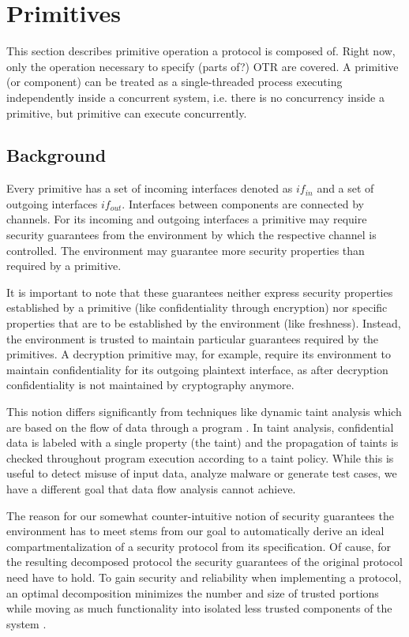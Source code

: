 \documentclass[a4paper,twocolumn]{article}
\begin{document}
\section{Primitives}

This section describes primitive operation a protocol is composed of. Right
now, only the operation necessary to specify (parts of?) OTR are covered. A
primitive (or component) can be treated as a single-threaded process executing
independently inside a concurrent system, i.e. there is no concurrency inside a
primitive, but primitive can execute concurrently.

\subsection{Background}

Every primitive has a set of incoming interfaces denoted as $if_{in}$ and a
set of outgoing interfaces $if_{out}$. Interfaces between components are
connected by channels. For its incoming and outgoing interfaces a primitive may
require security guarantees from the environment by which the respective
channel is controlled. The environment may guarantee more security properties
than required by a primitive.

It is important to note that these guarantees neither express security
properties established by a primitive (like confidentiality through encryption)
nor specific properties that are to be established by the environment (like
freshness). Instead, the environment is trusted to maintain particular
guarantees required by the primitives. A decryption primitive may, for example,
require its environment to maintain confidentiality for its outgoing plaintext
interface, as after decryption confidentiality is not maintained by
cryptography anymore.

This notion differs significantly from techniques like dynamic taint analysis
which are based on the flow of data through a program \cite{5504796}.  In taint
analysis, confidential data is labeled with a single property (the taint) and
the propagation of taints is checked throughout program execution according to
a taint policy. While this is useful to detect misuse of input data, analyze
malware or generate test cases, we have a different goal that data flow
analysis cannot achieve.

The reason for our somewhat counter-intuitive notion of security guarantees the
environment has to meet stems from our goal to automatically derive an ideal
compartmentalization of a security protocol from its specification. Of cause,
for the resulting decomposed protocol the security guarantees of the original
protocol need have to hold. To gain security and reliability when implementing
a protocol, an optimal decomposition minimizes the number and size of trusted
portions while moving as much functionality into isolated less trusted
components of the system \cite{10.1109/COLCOM.2005.1651218}. 
\end{document}
